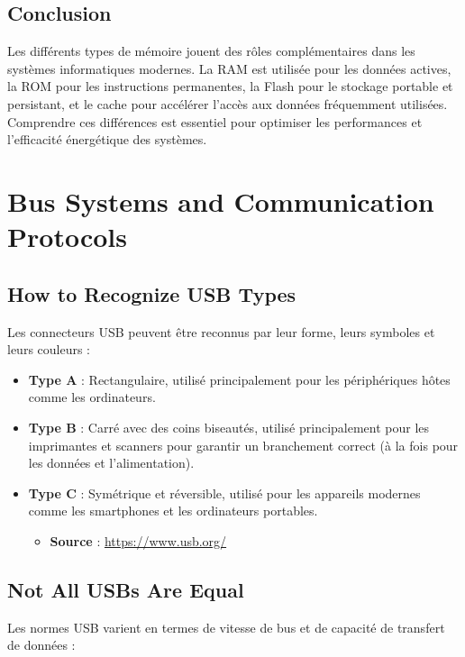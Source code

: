 \documentclass[10pt,a4paper]{article}
\begin{document}
\subsection*{Conclusion}

Les différents types de mémoire jouent des rôles complémentaires dans les systèmes informatiques modernes. La RAM est utilisée pour les données actives, la ROM pour les instructions permanentes, la Flash pour le stockage portable et persistant, et le cache pour accélérer l'accès aux données fréquemment utilisées. Comprendre ces différences est essentiel pour optimiser les performances et l'efficacité énergétique des systèmes.

\section*{Bus Systems and Communication Protocols}

\subsection*{How to Recognize USB Types}

Les connecteurs USB peuvent être reconnus par leur forme, leurs symboles et leurs couleurs :
\begin{itemize}
    \item \textbf{Type A} : Rectangulaire, utilisé principalement pour les périphériques hôtes comme les ordinateurs.
    \item \textbf{Type B} : Carré avec des coins biseautés, utilisé principalement pour les imprimantes et scanners pour garantir un branchement correct (à la fois pour les données et l'alimentation).
    \item \textbf{Type C} : Symétrique et réversible, utilisé pour les appareils modernes comme les smartphones et les ordinateurs portables.
    \begin{itemize}
        \item \textbf{Source} : \url{https://www.usb.org/}
    \end{itemize}
\end{itemize}

\subsection*{Not All USBs Are Equal}

Les normes USB varient en termes de vitesse de bus et de capacité de transfert de données :
\end{document}

